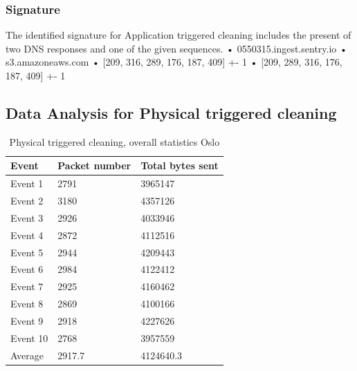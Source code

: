 \subsubsection{Signature}
The identified signature for Application triggered cleaning includes the present of two DNS
responses and one of the given sequences.
• 0550315.ingest.sentry.io
• s3.amazoneaws.com
• [209, 316, 289, 176, 187, 409] +- 1
• [209, 289, 316, 176, 187, 409] +- 1














\subsection{Data Analysis for Physical triggered cleaning}

\begin{table}[H]
\centering
\caption{Physical triggered cleaning, overall statistics Oslo}
\label{tab:PCoverallOSL}
\begin{tabular}{|l|l|l|}
\hline
\textbf{Event} & \textbf{Packet number} & \textbf{Total bytes sent} \\ \hline
Event 1        & 2791                   & 3965147                   \\ \hline
Event 2        & 3180                   & 4357126                   \\ \hline
Event 3        & 2926                   & 4033946                   \\ \hline
Event 4        & 2872                   & 4112516                   \\ \hline
Event 5        & 2944                   & 4209443                   \\ \hline
Event 6        & 2984                   & 4122412                   \\ \hline
Event 7        & 2925                   & 4160462                   \\ \hline
Event 8        & 2869                   & 4100166                   \\ \hline
Event 9        & 2918                   & 4227626                   \\ \hline
Event 10       & 2768                   & 3957559                   \\ \hline
Average        & 2917.7                 & 4124640.3                 \\ \hline
\end{tabular}
\end{table}

